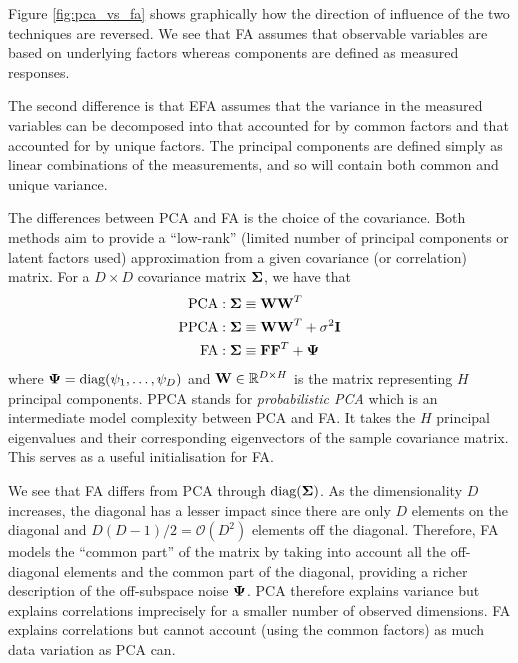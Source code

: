 \documentclass[12pt, letterpaper]{article}
\begin{document}
    Figure \ref{fig:pca_vs_fa} shows graphically how the direction of influence of the two techniques are reversed. We see that FA assumes that observable variables are based on underlying factors whereas components are defined as measured responses.
    
    
    
    The second difference is that EFA assumes that the variance in the measured variables can be decomposed into that accounted for by common factors and that accounted for by unique factors. The principal components are defined simply as linear combinations of the measurements, and so will contain both common and unique variance.


    The differences between PCA and FA is the choice of the covariance. Both methods aim to provide a ``low-rank'' (limited number of principal components or latent factors used) approximation from a given covariance (or correlation) matrix. For a $D\times D$ covariance matrix $\vb{\Sigma}$, we have that 
    \begin{align*}
        \text{PCA} &: \vb{\Sigma}\equiv \vb{WW}^T \\
        \text{PPCA} &: \vb{\Sigma}\equiv \vb{WW}^T + \sigma^2\vb{I} \\
        \text{FA} &: \vb{\Sigma}\equiv \vb{FF}^T+\vb{\Psi}
    \end{align*}
    where $\vb{\Psi}=\text{diag}(\psi_1,\dots,\psi_D)$ and $\vb{W}\in\mathbb{R}^{D\times H}$ is the matrix representing $H$ principal components. PPCA stands for \emph{probabilistic PCA} which is an intermediate model complexity between PCA and FA. It takes the $H$ principal eigenvalues and their corresponding eigenvectors of the sample covariance matrix. This serves as a useful initialisation for FA.
    
    We see that FA differs from PCA through $\text{diag}(\vb{\Sigma})$. As the dimensionality $D$ increases, the diagonal has a lesser impact since there are only $D$ elements on the diagonal and $D(D-1)/2 = \mathcal{O}(D^2)$ elements off the diagonal. Therefore, FA models the ``common part'' of the matrix by taking into account all the off-diagonal elements and the common part of the diagonal, providing a richer description of the off-subspace noise $\vb{\Psi}$. PCA therefore explains variance but explains correlations imprecisely for a smaller number of observed dimensions. FA explains correlations but cannot account (using the common factors) as much data variation as PCA can.
    
\end{document}
